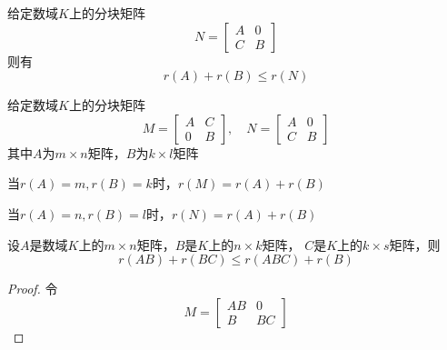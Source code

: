 \documentclass[11pt]{article}
\begin{document}
\begin{corollary}[]
给定数域\(K\)上的分块矩阵
\begin{equation*}
N=
\begin{bmatrix}
A&0\\
C&B
\end{bmatrix}
\end{equation*}
则有
\begin{equation*}
r(A)+r(B)\le r(N)
\end{equation*}
\end{corollary}

\begin{corollary}[]
给定数域\(K\)上的分块矩阵
\begin{equation*}
M=
\begin{bmatrix}
A&C\\
0&B
\end{bmatrix},\quad
N=
\begin{bmatrix}
A&0\\
C&B
\end{bmatrix}
\end{equation*}
其中\(A\)为\(m\times n\)矩阵，\(B\)为\(k\times l\)矩阵

当\(r(A)=m,r(B)=k\)时，\(r(M)=r(A)+r(B)\)

当\(r(A)=n,r(B)=l\)时，\(r(N)=r(A)+r(B)\)
\end{corollary}

\begin{proposition}[]
设\(A\)是数域\(K\)上的\(m\times n\)矩阵，\(B\)是\(K\)上的\(n\times k\)矩阵，
\(C\)是\(K\)上的\(k\times s\)矩阵，则
\begin{equation*}
r(AB)+r(BC)\le r(ABC)+r(B)
\end{equation*}
\end{proposition}

\begin{proof}
令
\begin{equation*}
M=
\begin{bmatrix}
AB&0\\
B&BC
\end{bmatrix}
\end{equation*}
\end{proof}
\end{document}
